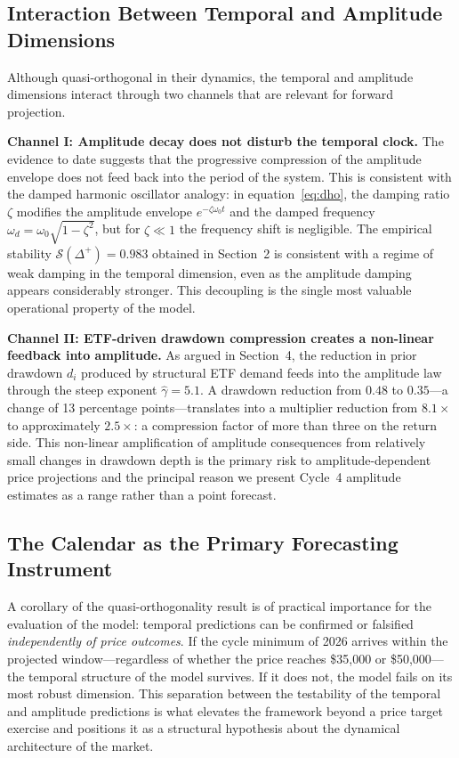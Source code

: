 \subsection{Interaction Between Temporal and Amplitude Dimensions}

Although quasi-orthogonal in their dynamics, the temporal and amplitude
dimensions interact through two channels that are relevant for forward
projection.

\textbf{Channel I: Amplitude decay does not disturb the temporal clock.}
The evidence to date suggests that the progressive compression of the amplitude
envelope does not feed back into the period of the system. This is consistent
with the damped harmonic oscillator analogy: in equation~\eqref{eq:dho}, the
damping ratio $\zeta$ modifies the amplitude envelope $e^{-\zeta\omega_0 t}$
and the damped frequency $\omega_d = \omega_0\sqrt{1-\zeta^2}$, but for
$\zeta \ll 1$ the frequency shift is negligible. The empirical stability
$\mathcal{S}(\Delta^{+}) = 0.983$ obtained in Section~2 is consistent with
a regime of weak damping in the temporal dimension, even as the amplitude
damping appears considerably stronger. This decoupling is the single most
valuable operational property of the model.

\textbf{Channel II: ETF-driven drawdown compression creates a non-linear
feedback into amplitude.} As argued in Section~4, the reduction in prior
drawdown $d_i$ produced by structural ETF demand feeds into the amplitude
law through the steep exponent $\hat{\gamma} = 5.1$. A drawdown reduction
from $0.48$ to $0.35$---a change of 13 percentage points---translates into a
multiplier reduction from $8.1\times$ to approximately $2.5\times$: a
compression factor of more than three on the return side. This non-linear
amplification of amplitude consequences from relatively small changes in
drawdown depth is the primary risk to amplitude-dependent price projections
and the principal reason we present Cycle~4 amplitude estimates as a range
rather than a point forecast.

\subsection{The Calendar as the Primary Forecasting Instrument}

A corollary of the quasi-orthogonality result is of practical importance for
the evaluation of the model: temporal predictions can be confirmed or falsified
\textit{independently of price outcomes}. If the cycle minimum of 2026 arrives
within the projected window---regardless of whether the price reaches
\$35,000 or \$50,000---the temporal structure of the model survives. If it
does not, the model fails on its most robust dimension. This separation between
the testability of the temporal and amplitude predictions is what elevates the
framework beyond a price target exercise and positions it as a structural
hypothesis about the dynamical architecture of the market.


